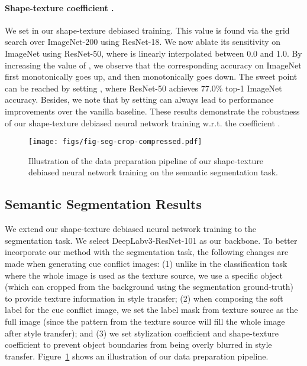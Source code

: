 \documentclass{article} \usepackage{iclr2021_conference,times}
\begin{document}
\paragraph{Shape-texture coefficient .}
We set  in our shape-texture debiased training. This value is found via the grid search over ImageNet-200 using ResNet-18. We now ablate its sensitivity on ImageNet using ResNet-50, where  is linearly interpolated between 0.0 and 1.0. By increasing the value of , we observe that the corresponding accuracy on ImageNet first monotonically goes up, and then monotonically goes down. The sweet point can be reached by setting , where ResNet-50 achieves 77.0\% top-1 ImageNet accuracy. Besides, we note that by setting  can always lead to performance improvements over the vanilla baseline. These results demonstrate the robustness of our shape-texture debiased neural network training w.r.t. the coefficient .

\begin{figure}[tb]
    \centering
    \texttt{[image: figs/fig-seg-crop-compressed.pdf]}
    \vspace{-2em}
    \caption{Illustration of the data preparation pipeline of our shape-texture debiased neural network training on the semantic segmentation task.}
    \vspace{-1em}
    \label{fig:seg}
\end{figure}

\subsection{Semantic Segmentation Results} \label{sec:exp_seg}
We extend our shape-texture debiased neural network training to the segmentation task. 
We select DeepLabv3-ResNet-101 \citep{chen2017rethinking} as our backbone.
To better incorporate our method with the segmentation task, the following changes are made when generating cue conflict images: (1) unlike in the classification task where the whole image is used as the texture source, we use a specific object (which can cropped from the background using the segmentation ground-truth) to provide texture information in style transfer; (2) when composing the soft label for the cue conflict image, we set the label mask from texture source as the full image (since the pattern from the texture source will fill the whole image after style transfer); 
and (3) we
set stylization coefficient  and shape-texture coefficient  to prevent object boundaries from being overly blurred in style transfer. Figure~\ref{fig:seg} shows an illustration of our data preparation pipeline.
\end{document}
